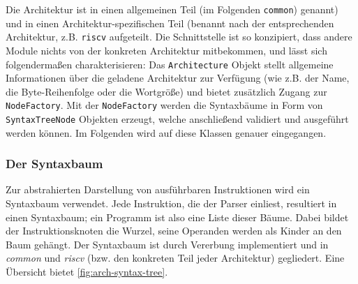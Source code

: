 Die Architektur ist in einen allgemeinen Teil (im Folgenden \texttt{common})
genannt) und in einen Architektur-spezifischen Teil (benannt nach der
entsprechenden Architektur, z.B. \texttt{riscv} aufgeteilt. Die Schnittstelle
ist so konzipiert, dass andere Module nichts von der konkreten Architektur
mitbekommen, und lässt sich folgendermaßen charakterisieren: Das
\texttt{Architecture} Objekt stellt allgemeine Informationen über die geladene
Architektur zur Verfügung (wie z.B. der Name, die Byte-Reihenfolge oder die
Wortgröße) und bietet zusätzlich Zugang zur \texttt{NodeFactory}. Mit der
\texttt{NodeFactory} werden die Syntaxbäume in Form von \texttt{SyntaxTreeNode}
Objekten erzeugt, welche anschließend validiert und ausgeführt werden können. Im
Folgenden wird auf diese Klassen genauer eingegangen.





\subsubsection{Der Syntaxbaum}

Zur abstrahierten Darstellung von ausführbaren Instruktionen wird ein Syntaxbaum
verwendet. Jede Instruktion, die der Parser einliest, resultiert in einen
Syntaxbaum; ein Programm ist also eine Liste dieser Bäume. Dabei bildet der
Instruktionsknoten die Wurzel, seine Operanden werden als Kinder an den Baum
gehängt. Der Syntaxbaum ist durch Vererbung implementiert und in \emph{common}
und \emph{riscv} (bzw. den konkreten Teil jeder Architektur) gegliedert. Eine
Übersicht bietet \autoref{fig:arch-syntax-tree}.

